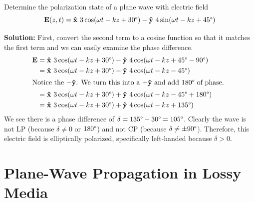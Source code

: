 \begin{example}
    Determine the polarization state of a plane wave with electric field 
    $$ \boldsymbol{\mathrm{E}}(z,t) = \boldsymbol{{\mathrm{\hat{x}}}}\ 3\cos(\omega t - kz + 30\degree) - \boldsymbol{{\mathrm{\hat{y}}}}\ 4\sin(\omega t - kz + 45\degree) $$ 

    \vspace{0.25cm}
    \textbf{Solution:} First, convert the second term to a cosine function so that it matches the first term and we can easily examine the phase difference. 
    \begin{align*}
        \vec{E} &= \uvec{x}\ 3\cos(\omega t - kz + 30\degree) - \uvec{y}\ 4\cos(\omega t - kz + 45\degree - 90\degree) \\ 
        &= \uvec{x}\ 3\cos(\omega t - kz + 30\degree) - \uvec{y}\ 4\cos(\omega t - kz - 45\degree) \\ 
        \intertext{Notice the $-\uvec{y}$. We turn this into a $+\uvec{y}$ and add 180$\degree$ of phase. }
        &= \uvec{x}\ 3\cos(\omega t - kz + 30\degree) + \uvec{y}\ 4\cos(\omega t - kz - 45\degree + 180\degree) \\ 
        &= \uvec{x}\ 3\cos(\omega t - kz + 30\degree) + \uvec{y}\ 4\cos(\omega t - kz + 135 \degree)
    \end{align*}
    We see there is a phase difference of $\delta = 135\degree - 30\degree = 105\degree$. Clearly the wave is not LP (because $\delta \neq 0$ or $180\degree$) and not CP (because $\delta \neq \pm 90\degree$). Therefore, this electric field is elliptically polarized, specifically left-handed because $\delta > 0$. 
\end{example}

\section{Plane-Wave Propagation in Lossy Media}

